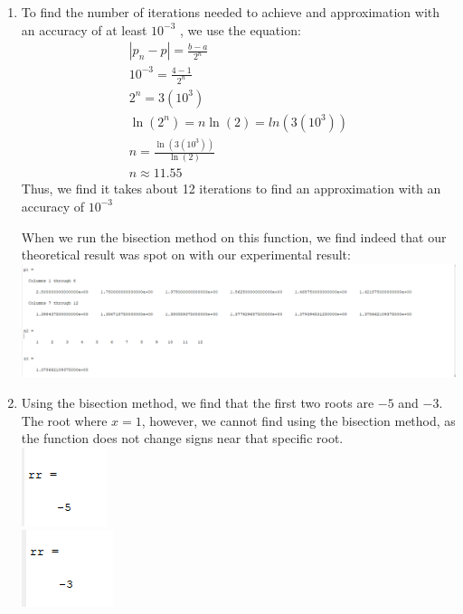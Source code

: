 \documentclass[12pt,letterpaper]{article}
\begin{document}
\begin{enumerate}
    \item 
    To find the number of iterations needed to achieve and approximation with 
    an accuracy of at least $10^{-3}$ , we use the equation:
    \begin{gather*}
        |p_n - p| = \frac{b-a}{2^n}\\
        10^{-3} = \frac{4-1}{2^n}\\
        2^n = 3(10^{3})\\
        \ln(2^n) = n\ln(2) = ln(3(10^3))\\
        n = \frac{\ln(3(10^3))}{\ln(2)}\\
        n \approx 11.55
    \end{gather*}
    Thus, we find it takes about 12 iterations to find an approximation with an 
    accuracy of $10^{-3}$

    When we run the bisection method on this function, we find indeed that our 
    theoretical result was spot on with our experimental result: \\
    \includegraphics[scale = .5]{number3.png}

    \item 
    Using the bisection method, we find that the first two roots are $-5$ and $-3$. 
    The root where $x = 1$, however, we cannot find using the bisection method, as 
    the function does not change signs near that specific root. \\
    \includegraphics{4a.png}\\
    \includegraphics{4b.png}


\end{enumerate}
\end{document}
